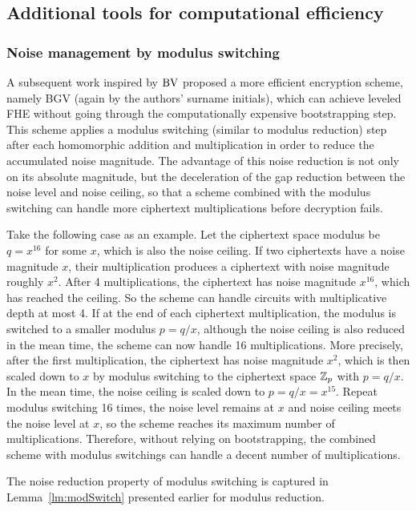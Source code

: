 \documentclass[../main.tex]{subfiles}
\begin{document}
\subsection{Additional tools for computational efficiency}


\subsubsection{Noise management by modulus switching}
A subsequent work inspired by $\text{BV}$ proposed a more efficient encryption scheme, namely BGV \cite{brakerski2014leveled} (again by the authors' surname initials), which can achieve leveled FHE without going through the computationally expensive bootstrapping step. This scheme applies a modulus switching (similar to modulus reduction) step after each homomorphic addition and multiplication in order to reduce the accumulated noise magnitude. The advantage of this noise reduction is not only on its absolute magnitude, but the deceleration of the gap reduction between the noise level and noise ceiling, so that a scheme combined with the modulus switching can handle more ciphertext multiplications before decryption fails. 

Take the following case as an example. Let the ciphertext space modulus be $q=x^{16}$ for some $x$, which is also the noise ceiling. If two ciphertexts have a noise magnitude $x$, their multiplication produces a ciphertext with noise magnitude roughly $x^2$. After 4 multiplications, the ciphertext has noise magnitude $x^{16}$, which has reached the ceiling. So the scheme can handle circuits with multiplicative depth at most 4. If at the end of each ciphertext multiplication, the modulus is switched to a smaller modulus $p=q/x$, although the noise ceiling is also reduced in the mean time, the scheme can now handle 16 multiplications. More precisely, after the first multiplication, the ciphertext has noise magnitude $x^2$, which is then scaled down to $x$ by modulus switching to the ciphertext space $\mathbb{Z}_p$ with $p=q/x$. In the mean time, the noise ceiling is scaled down to $p=q/x=x^{15}$. Repeat modulus switching 16 times, the noise level remains at $x$ and noise ceiling meets the noise level at $x$, so the scheme reaches its maximum number of multiplications. Therefore, without relying on bootstrapping, the combined scheme with modulus switchings can handle a decent number of multiplications.

The noise reduction property of modulus switching is captured in Lemma~\ref{lm:modSwitch} presented earlier for modulus reduction.
\end{document}
